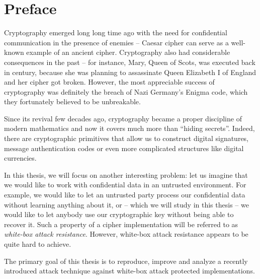 \cleardoublepage{}

\chapter*{Preface}


Cryptography emerged long long time ago with the need for confidential communication in the presence of enemies -- Caesar cipher can serve as a well-known example of an ancient cipher. Cryptography also had considerable consequences in the past -- for instance, Mary, Queen of Scots, was executed back in  century, because she was planning to assassinate Queen Elizabeth I of England and her cipher got broken. However, the most appreciable success of cryptography was definitely the breach of Nazi Germany's Enigma code, which they fortunately believed to be unbreakable.

Since its revival few decades ago, cryptography became a proper discipline of modern mathematics and now it covers much more than ``hiding secrets''. Indeed, there are cryptographic primitives that allow us to construct digital signatures, message authentication codes or even more complicated structures like digital currencies.

In this thesis, we will focus on another interesting problem: let us imagine that we would like to work with confidential data in an untrusted environment. For example, we would like to let an untrusted party process our confidential data without learning anything about it, or -- which we will study in this thesis -- we would like to let anybody use our cryptographic key without being able to recover it. Such a property of a cipher implementation will be referred to as {\em white-box attack resistance}. However, white-box attack resistance appears to be quite hard to achieve.

The primary goal of this thesis is to reproduce, improve and analyze a recently introduced attack technique \cite{bos2015differential} against white-box attack protected implementations.



